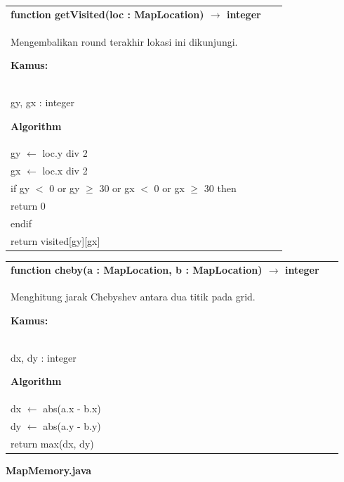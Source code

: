 \documentclass{article}
\newenvironment{pseudobox}
{
\centering
\begin{longtable}{|p{0.94\linewidth}|}
\hline
}
{
\\ \hline
\end{longtable}
\vspace{0.05cm}
}
\begin{document}
\begin{pseudobox}
\textbf{function getVisited(loc : MapLocation) $\rightarrow$ integer} \\
{ Mengembalikan round terakhir lokasi ini dikunjungi. }

\textbf{Kamus:} \\
\hspace*{1em} gy, gx : integer

\textbf{Algorithm} \\
\hspace*{1em} gy $\leftarrow$ loc.y div 2 \\
\hspace*{1em} gx $\leftarrow$ loc.x div 2 \\

\hspace*{1em} if gy $<$ 0 or gy $\geq$ 30 or gx $<$ 0 or gx $\geq$ 30 then \\
\hspace*{2em} return 0 \\
\hspace*{1em} endif \\

\hspace*{1em} return visited[gy][gx]
\end{pseudobox}


\begin{pseudobox}
\textbf{function cheby(a : MapLocation, b : MapLocation) $\rightarrow$ integer} \\
{ Menghitung jarak Chebyshev antara dua titik pada grid. }

\textbf{Kamus:} \\
\hspace*{1em} dx, dy : integer

\textbf{Algorithm} \\
\hspace*{1em} dx $\leftarrow$ abs(a.x - b.x) \\
\hspace*{1em} dy $\leftarrow$ abs(a.y - b.y) \\

\hspace*{1em} return max(dx, dy)
\end{pseudobox}

\item \textbf{MapMemory.java}
\end{document}
